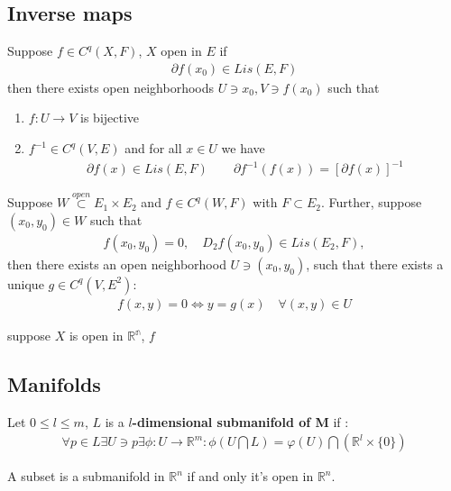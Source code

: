 \subsection{Inverse maps}

\begin{theorem}
	Suppose $f \in C^q(X, F)$, $X$ open in $E$ if 
	\begin{align*}
		\partial f(x_0) \in Lis(E, F)
	\end{align*}
	then there exists open neighborhoods $U \ni x_0, V \ni f(x_0)$ such that
	\begin{enumerate}
		\item  $f: U \rightarrow V$ is bijective
		\item $f^{-1} \in C^q(V, E)$ and for all $x \in U$ we have
			\begin{align*}
				\partial f(x) \in Lis(E, F) \qquad 
				\partial f^{-1} (f(x)) = [\partial f(x)]^{-1}
			\end{align*}
	\end{enumerate}
\end{theorem}


\begin{theorem}
	Suppose $W \overset{open}{\subset} E_1 \times E_2$ and $f \in C^q(W, F)$ with $F \subset E_2$. Further, suppose $(x_0, y_0) \in W$ such that
	\begin{align*}
		f(x_0, y_0) = 0, \quad  D_2 f(x_0, y_0) \in Lis(E_2, F),
	\end{align*}
	then there exists an open neighborhood $U \ni (x_0, y_0)$, such that there exists a unique $g \in C^q(V, E^2)$:
	\begin{align*}
		f(x, y) = 0 \Leftrightarrow y = g(x) \quad \forall (x, y) \in U
	\end{align*}
\end{theorem}

\begin{definition}
	suppose $X$ is open in $\mathbb{R^n}$, $f $ 
\end{definition}



\subsection{Manifolds}
\begin{definition}[Submanifolds of $M$]
	Let $0 \leq l \leq m$, $L$ is a \textbf{$l$-dimensional submanifold of M} if :
	\begin{align*}
		\forall p \in L \exists U \ni p \exists \phi: U \rightarrow \mathbb{R}^m: \phi(U \bigcap L) = \varphi(U) \bigcap 
		(\mathbb{R}^l \times \{0\} )
	\end{align*}
\end{definition}
\begin{example}
	A subset is a submanifold in $\mathbb{R}^n$ if and only it's open in $\mathbb{R}^n$.
\end{example}

